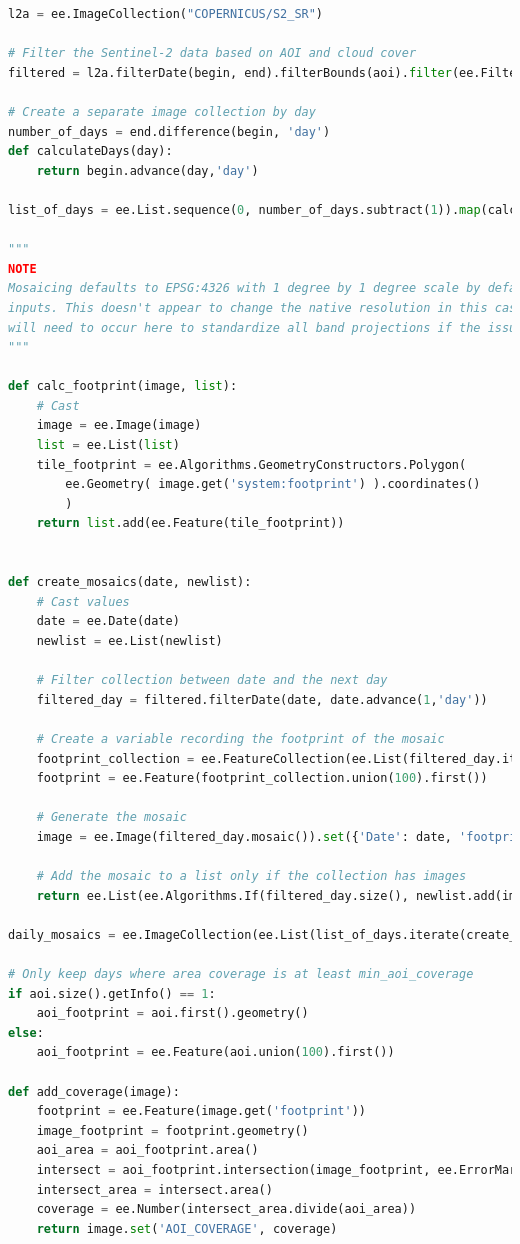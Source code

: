 \documentclass{article}
\begin{document}
\begin{lstlisting}[language=Python]
l2a = ee.ImageCollection("COPERNICUS/S2_SR")

# Filter the Sentinel-2 data based on AOI and cloud cover
filtered = l2a.filterDate(begin, end).filterBounds(aoi).filter(ee.Filter.lte('CLOUDY_PIXEL_PERCENTAGE', 15))

# Create a separate image collection by day
number_of_days = end.difference(begin, 'day')
def calculateDays(day):
    return begin.advance(day,'day')

list_of_days = ee.List.sequence(0, number_of_days.subtract(1)).map(calculateDays)

"""
NOTE
Mosaicing defaults to EPSG:4326 with 1 degree by 1 degree scale by default if there are competing 
inputs. This doesn't appear to change the native resolution in this case, but reprojection
will need to occur here to standardize all band projections if the issue emerges. 
"""

def calc_footprint(image, list):
    # Cast
    image = ee.Image(image)
    list = ee.List(list)
    tile_footprint = ee.Algorithms.GeometryConstructors.Polygon(
        ee.Geometry( image.get('system:footprint') ).coordinates()
        )
    return list.add(ee.Feature(tile_footprint))


def create_mosaics(date, newlist):
    # Cast values
    date = ee.Date(date)
    newlist = ee.List(newlist)
    
    # Filter collection between date and the next day
    filtered_day = filtered.filterDate(date, date.advance(1,'day'))
    
    # Create a variable recording the footprint of the mosaic 
    footprint_collection = ee.FeatureCollection(ee.List(filtered_day.iterate(calc_footprint, ee.List([]))))
    footprint = ee.Feature(footprint_collection.union(100).first())
    
    # Generate the mosaic 
    image = ee.Image(filtered_day.mosaic()).set({'Date': date, 'footprint': footprint})
    
    # Add the mosaic to a list only if the collection has images
    return ee.List(ee.Algorithms.If(filtered_day.size(), newlist.add(image), newlist))

daily_mosaics = ee.ImageCollection(ee.List(list_of_days.iterate(create_mosaics, ee.List([]))))

# Only keep days where area coverage is at least min_aoi_coverage
if aoi.size().getInfo() == 1:
    aoi_footprint = aoi.first().geometry()
else:
    aoi_footprint = ee.Feature(aoi.union(100).first())

def add_coverage(image):
    footprint = ee.Feature(image.get('footprint'))
    image_footprint = footprint.geometry()
    aoi_area = aoi_footprint.area()
    intersect = aoi_footprint.intersection(image_footprint, ee.ErrorMargin(1))
    intersect_area = intersect.area()
    coverage = ee.Number(intersect_area.divide(aoi_area))
    return image.set('AOI_COVERAGE', coverage)
    

\end{lstlisting}
\end{document}
